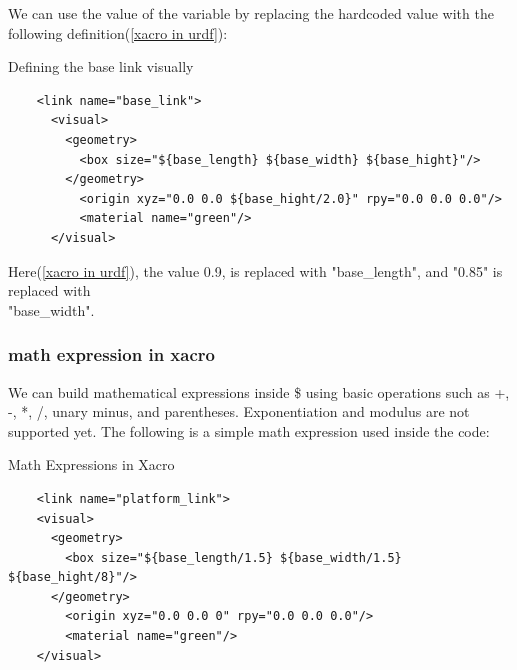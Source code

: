\documentclass[../../main]{subfiles}
\begin{document}
We can use the value of the variable by replacing the hardcoded value with the following
definition(\cref{xacro in urdf}):
\begin{codebox}[label=xacro in urdf]{Defining the base link visually}
  \begin{verbatim}
    <link name="base_link">
      <visual>
        <geometry>
          <box size="${base_length} ${base_width} ${base_hight}"/>
        </geometry>
          <origin xyz="0.0 0.0 ${base_hight/2.0}" rpy="0.0 0.0 0.0"/>
          <material name="green"/>
      </visual>
\end{verbatim}
  \end{codebox}

Here(\cref{xacro in urdf}), the value 0.9, is replaced with "{base\_length}", and "0.85" is
replaced with \\"{base\_width}".

\subsubsection{math expression in xacro}
We can build mathematical expressions inside \${} using basic operations such as +, -, *,
/, unary minus, and parentheses. Exponentiation and modulus are not supported yet. The
following is a simple math expression used inside the code:
\begin{codebox}[]{Math Expressions in Xacro}
  \begin{verbatim}
    <link name="platform_link">
    <visual>
      <geometry>
        <box size="${base_length/1.5} ${base_width/1.5} ${base_hight/8}"/>
      </geometry>
        <origin xyz="0.0 0.0 0" rpy="0.0 0.0 0.0"/>
        <material name="green"/>
    </visual>
\end{verbatim}
\end{codebox}
\end{document}
